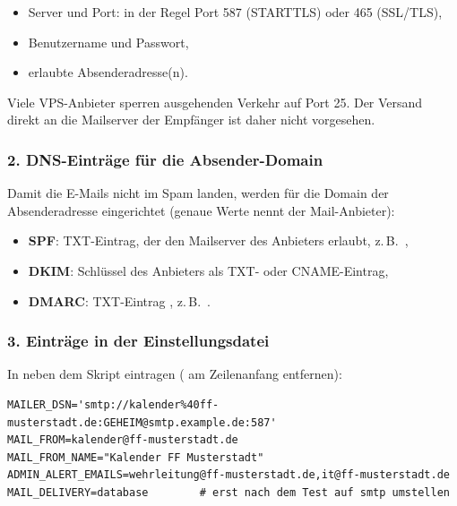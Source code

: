 \begin{itemize}
  \item Server und Port: in der Regel Port 587 (STARTTLS) oder 465 (SSL/TLS),
  \item Benutzername und Passwort,
  \item erlaubte Absenderadresse(n).
\end{itemize}

Viele VPS-Anbieter sperren ausgehenden Verkehr auf Port 25. Der Versand
direkt an die Mailserver der Empfänger ist daher nicht vorgesehen.

\subsubsection*{2. DNS-Einträge für die Absender-Domain}

Damit die E-Mails nicht im Spam landen, werden für die Domain der
Absenderadresse eingerichtet (genaue Werte nennt der Mail-Anbieter):

\begin{itemize}
  \item \textbf{SPF}: TXT-Eintrag, der den Mailserver des Anbieters erlaubt,
        z.\,B.\ ,
  \item \textbf{DKIM}: Schlüssel des Anbieters als TXT- oder CNAME-Eintrag,
  \item \textbf{DMARC}: TXT-Eintrag , z.\,B.\
        .
\end{itemize}

\subsubsection*{3. Einträge in der Einstellungsdatei}

In  neben dem Skript eintragen (\code{\#} am
Zeilenanfang entfernen):

\begin{lstlisting}
MAILER_DSN='smtp://kalender%40ff-musterstadt.de:GEHEIM@smtp.example.de:587'
MAIL_FROM=kalender@ff-musterstadt.de
MAIL_FROM_NAME="Kalender FF Musterstadt"
ADMIN_ALERT_EMAILS=wehrleitung@ff-musterstadt.de,it@ff-musterstadt.de
MAIL_DELIVERY=database        # erst nach dem Test auf smtp umstellen
\end{lstlisting}

